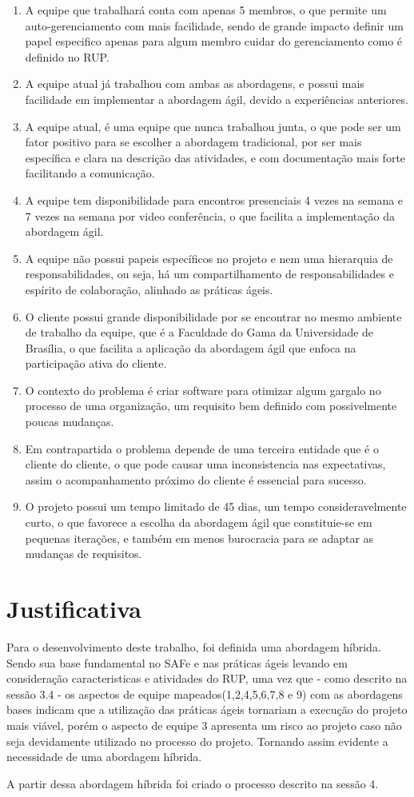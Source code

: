 \begin{enumerate}
  \item A equipe que trabalhará conta com apenas 5 membros, o que permite um
  auto-gerenciamento com mais facilidade, sendo de grande impacto definir um
  papel especifico apenas para algum membro cuidar do gerenciamento como é definido no RUP.
  \item A equipe atual já trabalhou com ambas as abordagens, e possui mais facilidade
  em implementar a abordagem ágil, devido a experiências anteriores.
  \item A equipe atual, é uma equipe que nunca trabalhou junta, o que pode ser um
  fator positivo para se escolher a abordagem tradicional, por ser mais específica
  e clara na descrição das atividades, e com documentação mais forte facilitando a comunicação.
  \item A equipe tem disponibilidade para encontros presenciais 4 vezes na semana
  e 7 vezes na semana por video conferência, o que facilita a implementação da abordagem ágil.
  \item A equipe não possui papeis específicos no projeto e nem uma hierarquia de
  responsabilidades, ou seja, há um compartilhamento de responsabilidades e espírito
  de colaboração, alinhado as práticas ágeis.
  \item O cliente possui grande disponibilidade por se encontrar no mesmo ambiente
  de trabalho da equipe, que é a Faculdade do Gama da Universidade de Brasília,
  o que facilita a aplicação da abordagem ágil que enfoca na participação ativa do cliente.
  \item O contexto do problema é criar software para otimizar algum gargalo no processo
  de uma organização, um requisito bem definido com possivelmente poucas mudanças.
  \item Em contrapartida o problema depende de uma terceira entidade que é o cliente
  do cliente, o que pode causar uma inconsistencia nas expectativas, assim o acompanhamento
  próximo do cliente é essencial para sucesso.
  \item O projeto possui um tempo limitado de 45 dias, um tempo consideravelmente curto,
  o que favorece a escolha da abordagem ágil que constituie-se em pequenas iterações,
  e também em menos burocracia para se adaptar as mudanças de requisitos.
\end{enumerate}

\section{Justificativa}

Para o desenvolvimento deste trabalho, foi definida uma abordagem híbrida.
Sendo sua base fundamental no SAFe e nas práticas ágeis levando em consideração
caracteristicas e atividades do RUP, uma vez que - como descrito na sessão 3.4
- os aspectos de equipe mapeados(1,2,4,5,6,7,8 e 9) com as abordagens bases
indicam que a utilização das práticas ágeis tornariam a execução do projeto mais
viável, porém o aspecto de equipe 3 apresenta um risco ao projeto caso não seja
devidamente utilizado no processo do projeto. Tornando assim evidente a necessidade
de uma abordagem híbrida.

A partir dessa abordagem híbrida foi criado o processo descrito na sessão 4.
